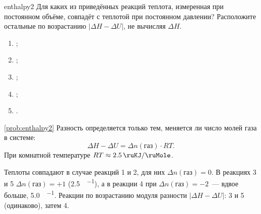 \begin{problem}{}{enthalpy2}
    Для каких из приведённых реакций теплота, измеренная при постоянном объёме, совпадёт с теплотой при постоянном давлении? Расположите остальные по возрастанию $\left|\Delta{}H - \Delta{}U\right|$, не вычисляя $\Delta{}H$.
    \begin{enumerate}[label=\arabic*)]
        \item {};
        \item {};
        \item {};
        \item {};
        \item {}.
    \end{enumerate}
    \begin{sol}{\ref{prob:enthalpy2}}
        Разность определяется только тем, меняется ли число молей газа в системе:
        \begin{equation*}
            \Delta{}H - \Delta{}U = \Delta{}n(\text{газ}) \cdot RT.
        \end{equation*}
        При комнатной температуре $RT \approx \qty{2,5}{\ruKJ\per\ruMole}$.

        Теплоты совпадают в случае реакций 1 и 2, для них $\Delta{}n(\text{газ}) = 0$. В реакциях 3 и 5 $\Delta{}n(\text{газ}) = +1$ (\qty{2,5}{\ruKJ\per\ruMole}), а в реакции 4 при $\Delta{}n(\text{газ}) = -2$~--- вдвое больше, \qty{5,0}{\ruKJ\per\ruMole}.
        Реакции по возрастанию модуля разности $\left|\Delta{}H - \Delta{}U\right|$: 3 и 5 (одинаково), затем 4.
    \end{sol}
\end{problem}

